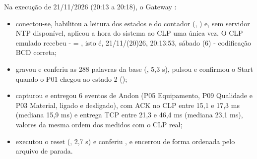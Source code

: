 Na execução de 21/11/2026 (20:13 a 20:18), o Gateway :
\begin{itemize}
    \item conectou-se, habilitou a leitura dos estados e do contador (, ) e, sem servidor NTP disponível, aplicou a hora do sistema ao CLP uma única vez. O CLP emulado recebeu - = , isto é, 21/11/(20)26, 20:13:53, sábado (6) - codificação BCD correta;
    \item gravou e conferiu as 288 palavras da base (, 5,3 s), pulsou  e confirmou o Start quando o P01 chegou ao estado 2 ();
    \item capturou e entregou 6 eventos de Andon (P05 Equipamento, P09 Qualidade e P03 Material, ligado e desligado), com ACK no CLP entre 15,1 e 17,3 ms (mediana 15,9 ms) e entrega TCP entre 21,3 e 46,4 ms (mediana 23,1 ms), valores da mesma ordem dos medidos com o CLP real;
    \item executou o reset (, 2,7 s) e conferiu , e encerrou de forma ordenada pelo arquivo de parada.
\end{itemize}
